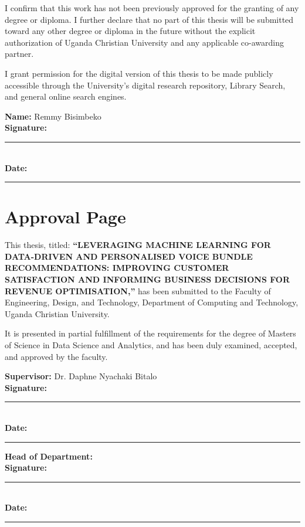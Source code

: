 \documentclass[12pt, a4paper]{report}
\begin{document}
I confirm that this work has not been previously approved for the granting of any degree or diploma. I further declare that no part of this thesis will be submitted toward any other degree or diploma in the future without the explicit authorization of Uganda Christian University and any applicable co-awarding partner.

I grant permission for the digital version of this thesis to be made publicly accessible through the University's digital research repository, Library Search, and general online search engines.

\vspace{2cm}
\noindent \textbf{Name:} Remmy Bisimbeko \\
\noindent \textbf{Signature:} \rule{4cm}{0.5pt} \\
\noindent \textbf{Date:} \rule{4cm}{0.5pt}

\chapter*{Approval Page}

This thesis, titled: \textbf{“LEVERAGING MACHINE LEARNING FOR DATA-DRIVEN AND PERSONALISED VOICE BUNDLE RECOMMENDATIONS: IMPROVING CUSTOMER SATISFACTION AND INFORMING BUSINESS DECISIONS FOR REVENUE OPTIMISATION,”} has been submitted to the Faculty of Engineering, Design, and Technology, Department of Computing and Technology, Uganda Christian University.

It is presented in partial fulfillment of the requirements for the degree of Masters of Science in Data Science and Analytics, and has been duly examined, accepted, and approved by the faculty.

\vspace{1cm}
\noindent \textbf{Supervisor:} Dr. Daphne Nyachaki Bitalo \\
\noindent \textbf{Signature:} \rule{4cm}{0.5pt} \\
\noindent \textbf{Date:} \rule{4cm}{0.5pt}

\vfill
\noindent \textbf{Head of Department:} \\
\noindent \textbf{Signature:} \rule{4cm}{0.5pt} \\
\noindent \textbf{Date:} \rule{4cm}{0.5pt}

\clearpage

\end{document}
